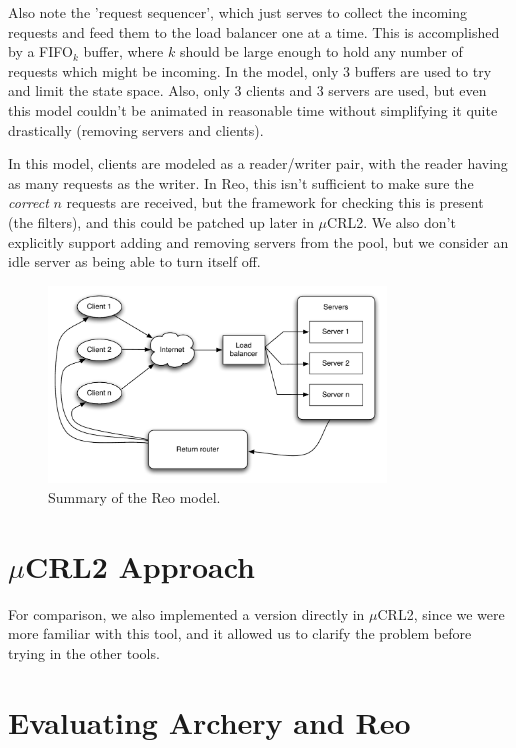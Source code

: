 \documentclass[a4paper]{article}
\newcommand{\ar}{Archery\xspace}
\newcommand{\re}{Reo\xspace}
\newcommand{\mcrl}{$\mu$CRL2\xspace}
\begin{document}
Also note the 'request sequencer', which just serves to collect the incoming
requests and feed them to the load balancer one at a time. This is accomplished
by a FIFO$_k$ buffer, where $k$ should be large enough to hold any number of
requests which might be incoming. In the model, only 3 buffers are used to try
and limit the state space. Also, only 3 clients and 3 servers are used, but even
this model couldn't be animated in reasonable time without simplifying it quite
drastically (removing servers and clients).

In this model, clients are modeled as a reader/writer pair, with the reader
having as many requests as the writer. In \re, this isn't sufficient to make
sure the \emph{correct} $n$ requests are received, but the framework for
checking this is present (the filters), and this could be patched up later in
\mcrl. We also don't explicitly support adding and removing servers from the
pool, but we consider an idle server as being able to turn itself off.

\begin{figure}[h]
    \begin{center}
        \includegraphics[width=0.8\textwidth]{images/reo-model.pdf}
    \end{center}
    \caption{Summary of the \re model.}
    \label{fig:reo}
\end{figure}

\section{\mcrl Approach}

For comparison, we also implemented a version directly in \mcrl, since we were
more familiar with this tool, and it allowed us to clarify the problem before
trying in the other tools.

%
%
\section{Evaluating \ar and \re}
\end{document}
